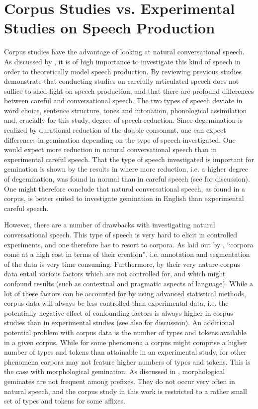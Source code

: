 \section{Corpus Studies vs. Experimental Studies on Speech Production} \label{corpus and experimental studies}


Corpus studies have the advantage of looking at natural conversational speech. As discussed by \cite{Tucker.2016}, it is of high importance to investigate this kind of speech in order to theoretically model speech production.  By reviewing previous studies \cite{Tucker.2016} demonstrate that conducting studies on carefully articulated speech does not suffice to shed light on speech production, and that there are profound differences between careful and conversational speech. The two types of speech deviate in word choice, sentence structure, tones and intonation, phonological assimilation and, crucially for this study, degree of speech reduction. Since degemination is realized by durational reduction of the double consonant, one can expect differences in gemination depending on the type of speech investigated. One would expect more reduction in natural conversational speech than in experimental careful speech. That the type of speech investigated is important for gemination is shown by the results in \cite{Oh.2012} where more reduction, i.e. a higher degree of degemination, was found in normal than in careful speech (see  for discussion). One might therefore conclude that natural conversational speech, as found in a corpus, is better suited to investigate gemination in English than experimental careful speech.

However, there are a number of drawbacks with investigating natural conversational speech. This type of speech is very hard to elicit in controlled experiments, and one therefore has to resort to corpora. As laid out by \citet[21]{Tucker.2016}, ``corpora come at a high cost in terms of their creation'', i.e. annotation and segmentation of the data is very time consuming. 
Furthermore, by their very nature corpus data entail various factors which are not controlled for, and which might confound results (such as contextual and pragmatic aspects of language). While a lot of these factors can be accounted for by using advanced statistical methods, corpus data will always be less controlled than experimental data, i.e. the potentially negative effect of confounding factors is always higher in corpus studies than in experimental studies (see also \citet[144]{Kunter.13.04.2017} for discussion).
An additional potential problem with corpus data is the number of types and tokens available in a given corpus. While for some phenomena a corpus might comprise a higher number of types and tokens than attainable in an experimental study, for other phenomena corpora may not feature higher numbers of types and tokens. This is the case with morphological gemination. As discussed in , morphological geminates are not frequent among prefixes. They do not occur very often in natural speech, and the corpus study in this work is restricted to a rather small set of types and tokens for some affixes. 

